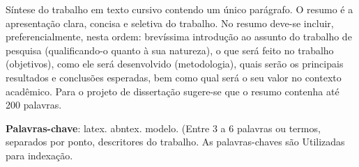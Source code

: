 %
%

\begin{resumo}

Síntese do trabalho em texto cursivo contendo um único parágrafo. O resumo é a apresentação clara, concisa e seletiva do trabalho.
No resumo deve-se incluir, preferencialmente, nesta ordem: brevíssima introdução ao assunto do trabalho de pesquisa (qualificando-o quanto à sua natureza), o que será feito no trabalho (objetivos), como ele será desenvolvido (metodologia), quais serão os principais resultados e conclusões esperadas, bem como qual será o seu valor no contexto acadêmico. Para o projeto de dissertação sugere-se que o resumo contenha até 200 palavras.

\textbf{Palavras-chave}: latex. abntex. modelo.
 (Entre 3 a 6 palavras ou termos, separados por ponto, descritores do trabalho. As palavras-chaves são Utilizadas para indexação.

\end{resumo}
